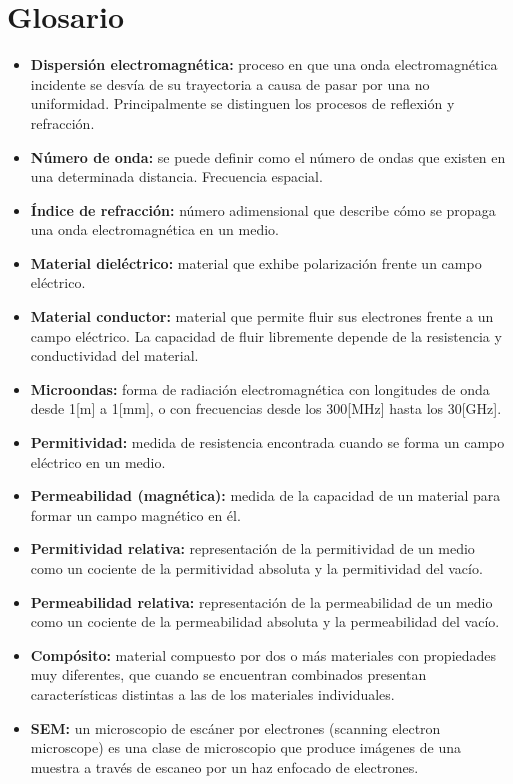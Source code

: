 \documentclass[12pt,letterpaper]{article}
\numberwithin{equation}{section}
\begin{document}
\section*{Glosario}
\begin{itemize}
	\renewcommand\labelitemi{--}
	\item \textbf{Dispersión electromagnética:} proceso en que una onda electromagnética incidente se desvía de su trayectoria a causa de pasar por una no uniformidad. Principalmente se distinguen los procesos de reflexión y refracción. 
	\item \textbf{Número de onda:} se puede definir como el número de ondas que existen en una determinada distancia. Frecuencia espacial.
	\item \textbf{Índice de refracción:} número adimensional que describe cómo se propaga una onda electromagnética en un medio.
	\item \textbf{Material dieléctrico:} material que exhibe polarización frente un campo eléctrico. 
	\item \textbf{Material conductor:} material que permite fluir sus electrones frente a un campo eléctrico. La capacidad de fluir libremente depende de la resistencia y conductividad del material.
	\item \textbf{Microondas:} forma de radiación electromagnética con longitudes de onda desde 1[m] a 1[mm], o con frecuencias desde los 300[MHz] hasta los 30[GHz].
	\item \textbf{Permitividad:} medida de resistencia encontrada cuando se forma un campo eléctrico en un medio.
	\item \textbf{Permeabilidad (magnética):} medida de la capacidad de un material para formar un campo magnético en él.
	\item \textbf{Permitividad relativa:} representación de la permitividad de un medio como un cociente de la permitividad absoluta y la permitividad del vacío. 
	\item \textbf{Permeabilidad relativa:} representación de la permeabilidad de un medio como un cociente de la permeabilidad absoluta y la permeabilidad del vacío. 
	\item \textbf{Compósito:} material compuesto por dos o más materiales con propiedades muy diferentes, que cuando se encuentran combinados presentan características distintas a las de los materiales individuales.  
	\item \textbf{SEM:} un microscopio de escáner por electrones (scanning electron microscope) es una clase de microscopio que produce imágenes de una muestra a través de escaneo por un haz enfocado de electrones.

\end{itemize}
\end{document}
